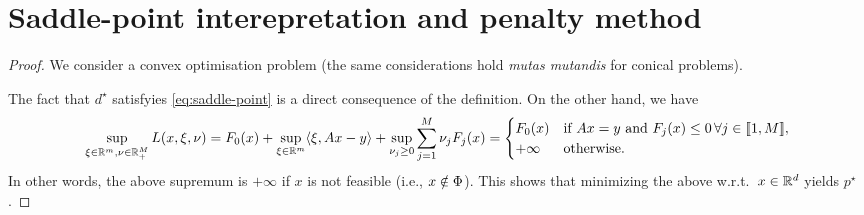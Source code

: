      \section{Saddle-point interepretation and penalty method}
 
 
 
 
 
     \begin{proof}
         We consider a convex optimisation problem (the same considerations hold \emph{mutas mutandis} for conical problems).
 
         The fact that $d^\star$ satisfyies \eqref{eq:saddle-point} is a direct consequence of the definition.
         On the other hand, we have
         \begin{equation}
             \sup_{\xi\in\mathbb{R}^m, \nu\in \mathbb{R}^M_+} L(x,\xi,\nu) = F_0(x) + \sup_{\xi\in \mathbb{R}^m} \langle \xi,Ax-y\rangle + \sup_{\nu_j\ge 0} \sum_{j=1}^M \nu_j F_j(x)
             =
             \begin{cases}
                 F_0(x)  & \text{if } Ax=y\text{ and } F_j(x)\le 0 \, \forall j\in\llbracket1,M\rrbracket, \\
                 +\infty & \text{otherwise}.
             \end{cases}
         \end{equation}
         In other words, the above supremum is $+\infty$ if $x$ is not feasible (i.e., $x\notin\operatorname{\Phi}$). This shows that minimizing the above w.r.t.~$x\in \mathbb{R}^d$ yields $p^\star$.
     \end{proof}
 
